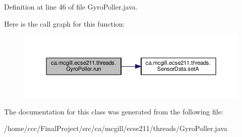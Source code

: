 Definition at line 46 of file Gyro\+Poller.\+java.

Here is the call graph for this function\+:
\nopagebreak
\begin{figure}[H]
\begin{center}
\leavevmode
\includegraphics[width=350pt]{classca_1_1mcgill_1_1ecse211_1_1threads_1_1_gyro_poller_a7a3232e355cece714fa85a3a902d9cfd_cgraph}
\end{center}
\end{figure}


The documentation for this class was generated from the following file\+:\begin{DoxyCompactItemize}
\item 
/home/ccc/\+Final\+Project/src/ca/mcgill/ecse211/threads/Gyro\+Poller.\+java\end{DoxyCompactItemize}
